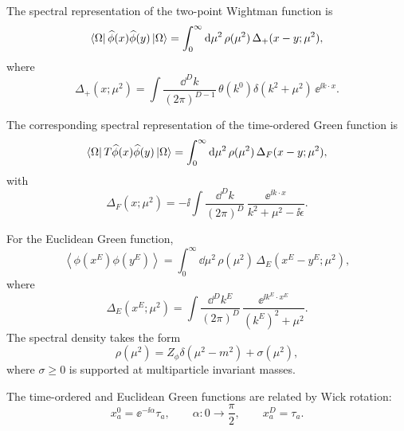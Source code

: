 The spectral representation of the two-point Wightman function is
\[
  \bra{\Omega}\widehat\phi(x)\widehat\phi(y)\ket{\Omega}
  =
  \int_0^\infty \mathrm{d}\mu^2\,\rho(\mu^2)\,
  \Delta_+(x-y;\mu^2),
\]
where
\[
  \Delta_+(x;\mu^2)
  =
  \int \frac{\dd^D k}{(2\pi)^{D-1}}\,
  \theta(k^0)\delta(k^2+\mu^2)\,\ee^{\ii k\cdot x}.
\]

The corresponding spectral representation of the time-ordered Green
function is
\[
  \bra{\Omega}T\widehat\phi(x)\widehat\phi(y)\ket{\Omega}
  =
  \int_0^\infty \mathrm{d}\mu^2\,\rho(\mu^2)\,
  \Delta_F(x-y;\mu^2),
\]
with
\[
  \Delta_F(x;\mu^2)
  =
  -\ii\int \frac{\dd^D k}{(2\pi)^D}\,
  \frac{\ee^{\ii k\cdot x}}{k^2+\mu^2-\ii\epsilon}.
\]

For the Euclidean Green function,
\[
  \left\langle \phi(x^E)\phi(y^E)\right\rangle
  =
  \int_0^\infty \dd\mu^2\,\rho(\mu^2)\,
  \Delta_E(x^E-y^E;\mu^2),
\]
where
\[
  \Delta_E(x^E;\mu^2)
  =
  \int \frac{\dd^D k^E}{(2\pi)^D}\,
  \frac{\ee^{\ii k^E\cdot x^E}}{(k^E)^2+\mu^2}.
\]
The spectral density takes the form
\[
  \rho(\mu^2)
  =
  Z_\phi\delta(\mu^2-m^2)+\sigma(\mu^2),
\]
where \(\sigma\geq 0\) is supported at multiparticle invariant masses.

\begin{center}
\end{center}

The time-ordered and Euclidean Green functions are related by Wick
rotation:
\[
  x_a^0=\ee^{-\ii\alpha}\tau_a,
  \qquad
  \alpha:0\to\frac{\pi}{2},
  \qquad
  x_a^D=\tau_a.
\]

